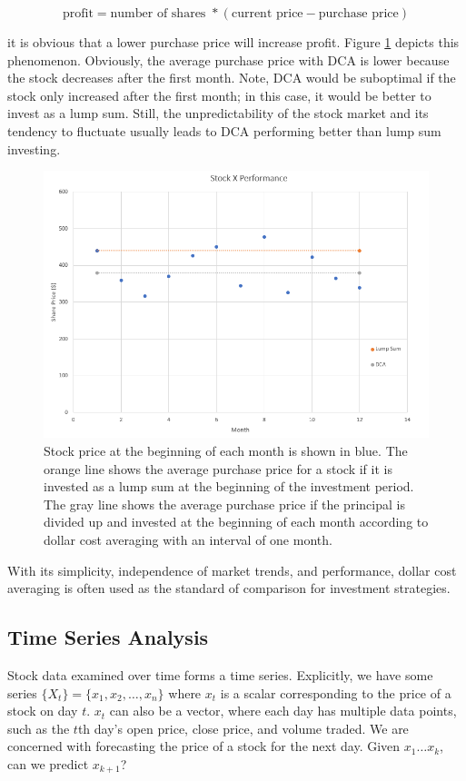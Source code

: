 \documentclass[12pt]{article}
\begin{document}
$$\text{profit} = \text{number of shares } *( \text{current price} - \text{purchase price} )$$

it is obvious that a lower purchase price will increase profit. Figure \ref{dca} depicts this phenomenon. Obviously, the average purchase price with DCA is lower because the stock decreases after the first month. Note, DCA would be suboptimal if the stock only increased after the first month; in this case, it would be better to invest as a lump sum. Still, the unpredictability of the stock market and its tendency to fluctuate usually leads to DCA performing better than lump sum investing.

\begin{figure}[ht]
	\centering
	\includegraphics[width=.7\textwidth]{dca.png}
	\caption{Stock price at the beginning of each month is shown in blue. The orange line shows the average purchase price for a stock if it is invested as a lump sum at the beginning of the investment period. The gray line shows the average purchase price if the principal is divided up and invested at the beginning of each month according to dollar cost averaging with an interval of one month. \cite{dca}}
	\label{dca}
\end{figure}

With its simplicity, independence of market trends, and performance, dollar cost averaging is often used as the standard of comparison for investment strategies.

\subsection{Time Series Analysis}
Stock data examined over time forms a time series. Explicitly, we have some series $\{X_t\} = \{x_1, x_2, \dots, x_n\}$ where $x_t$ is a scalar corresponding to the price of a stock on day $t$. $x_t$ can also be a vector, where each day has multiple data points, such as the $t$th day's open price, close price, and volume traded. We are concerned with forecasting the price of a stock for the next day. Given $x_1 \dots x_k$, can we predict $x_{k+1}$?
\end{document}
